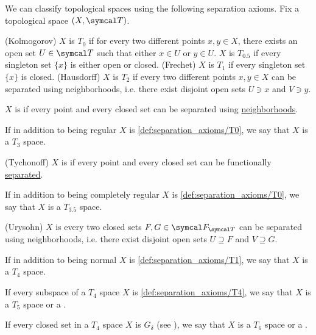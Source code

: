 \begin{definition}\label{def:separation_axioms}
  We can classify topological spaces using the following separation axioms. Fix a topological space \( (X, \Cal{T}) \).

  \begin{DefEnum}
     (Kolmogorov) \( X \) is \( T_0 \) if for every two different points \( x, y \in X \), there exists an open set \( U \in \Cal{T} \) such that either \( x \in U \) or \( y \in U \).
     \( X \) is \( T_{0.5} \) if every singleton set \( \{ x \} \) is either open or closed.
     (Frechet) \( X \) is \( T_1 \) if every singleton set \( \{ x \} \) is closed.
     (Hausdorff) \( X \) is \( T_2 \) if every two different points \( x, y \in X \) can be separated using neighborhoods, i.e. there exist disjoint open sets \( U \ni x \) and \( V \ni y \).

     \( X \) is  if every point and every closed set can be separated using \hyperref[def:topological_space_separation]{neighborhoods}.

    If in addition to being regular \( X \) is \ref{def:separation_axioms/T0}, we say that \( X \) is a \( T_3 \) space.

     (Tychonoff) \( X \) is  if every point and every closed set can be functionally \hyperref[def:topological_space_separation]{separated}.

    If in addition to being completely regular \( X \) is \ref{def:separation_axioms/T0}, we say that \( X \) is a \( T_{3.5} \) space.

    (Urysohn) \( X \) is  every two closed sets \( F, G \in \Cal{F}_{\Cal{T}} \) can be separated using neighborhoods, i.e. there exist disjoint open sets \( U \supseteq F \) and \( V \supseteq G \).

    If in addition to being normal \( X \) is \ref{def:separation_axioms/T1}, we say that \( X \) is a \( T_4 \) space.

     If every subspace of a \( T_4 \) space \( X \) is \ref{def:separation_axioms/T4}, we say that \( X \) is a \( T_5 \) space or a .

     If every closed set in a \( T_4 \) space \( X \) is \( G_\delta \) (see ), we say that \( X \) is a \( T_6 \) space or a .
  \end{DefEnum}
\end{definition}

